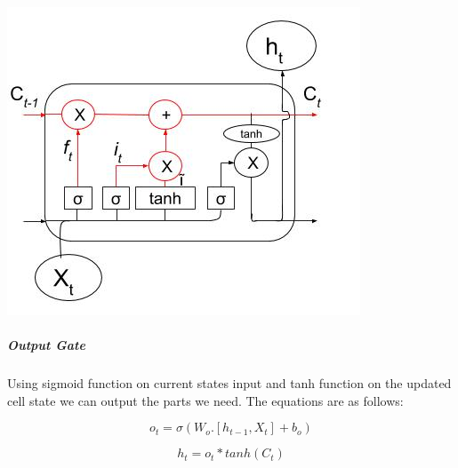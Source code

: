 				\begin{center}
				\includegraphics[width=\linewidth]{figures/update-to-new-cell-state.jpg}	
				\label{fig: Update to new cell state}
				\end{center}


\subparagraph{Output Gate}

Using sigmoid function on current states input and tanh function on the updated cell state we can output the parts we need. The equations are as follows:

\begin{equation}
	o_{t} = \sigma (W_{o} . [h_{t-1}, X_{t}] + b_{o})
\end{equation}

\begin{equation}
	h_{t}  = o_{t} * tanh( C_{t} )
\end{equation}

